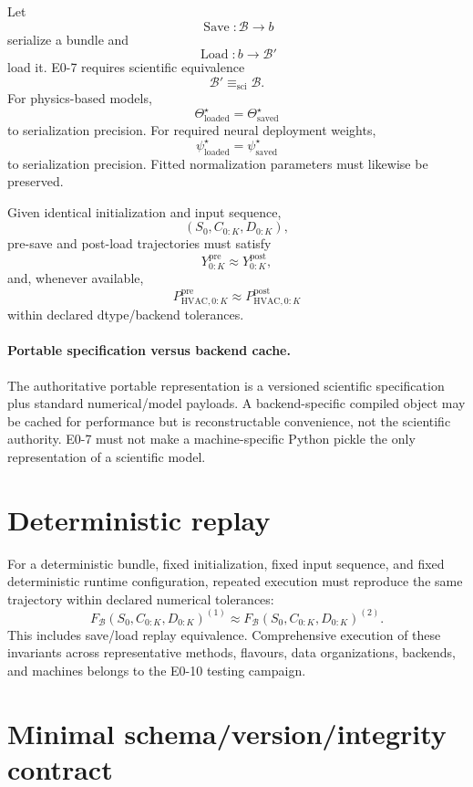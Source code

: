 \documentclass[11pt]{article}
\newcommand{\Bun}{\mathcal{B}}
\begin{document}
Let
\[
\operatorname{Save}:\Bun\rightarrow b
\]
serialize a bundle and
\[
\operatorname{Load}:b\rightarrow\Bun'
\]
load it. E0-7 requires scientific equivalence
\[
\boxed{\Bun'\equiv_{\mathrm{sci}}\Bun.}
\]
For physics-based models,
\[
\Theta_{\mathrm{loaded}}^\star
=\Theta_{\mathrm{saved}}^\star
\]
to serialization precision. For required neural deployment weights,
\[
\psi_{\mathrm{loaded}}^\star
=\psi_{\mathrm{saved}}^\star
\]
to serialization precision. Fitted normalization parameters must likewise be
preserved.

Given identical initialization and input sequence,
\[
(S_0,C_{0:K},D_{0:K}),
\]
pre-save and post-load trajectories must satisfy
\[
Y_{0:K}^{\mathrm{pre}}
\approx
Y_{0:K}^{\mathrm{post}},
\]
and, whenever available,
\[
P_{\mathrm{HVAC},0:K}^{\mathrm{pre}}
\approx
P_{\mathrm{HVAC},0:K}^{\mathrm{post}}
\]
within declared dtype/backend tolerances.

\paragraph{Portable specification versus backend cache.}
The authoritative portable representation is a versioned scientific
specification plus standard numerical/model payloads. A backend-specific compiled
object may be cached for performance but is reconstructable convenience, not the
scientific authority. E0-7 must not make a machine-specific Python pickle the
only representation of a scientific model.

\section{Deterministic replay}

For a deterministic bundle, fixed initialization, fixed input sequence, and
fixed deterministic runtime configuration, repeated execution must reproduce the
same trajectory within declared numerical tolerances:
\[
F_{\Bun}(S_0,C_{0:K},D_{0:K})^{(1)}
\approx
F_{\Bun}(S_0,C_{0:K},D_{0:K})^{(2)}.
\]
This includes save/load replay equivalence. Comprehensive execution of these
invariants across representative methods, flavours, data organizations,
backends, and machines belongs to the E0-10 testing campaign.

\section{Minimal schema/version/integrity contract}
\end{document}
